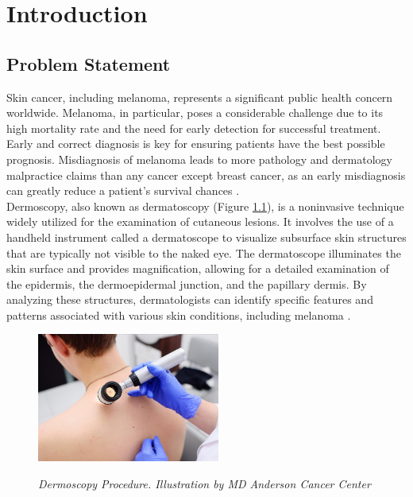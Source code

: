 \chapter{Introduction}
\label{cap:intro}

\section{Problem Statement}

Skin cancer, including melanoma, represents a significant public health concern
worldwide. Melanoma, in particular, poses a considerable challenge due to its
high mortality rate and the need for early detection for successful treatment.
Early and correct diagnosis is key for ensuring patients have the best possible
prognosis. Misdiagnosis of melanoma leads to more pathology and dermatology
malpractice claims than any cancer except breast cancer, as an early
misdiagnosis can greatly reduce a patient's survival chances \cite{Melanoma}. \\

Dermoscopy, also known as dermatoscopy (Figure \ref{fig:procedure_dermoscopy}),
is a noninvasive technique widely utilized for the examination of cutaneous
lesions. It involves the use of a handheld instrument called a dermatoscope to
visualize subsurface skin structures that are typically not visible to the
naked eye. The dermatoscope illuminates the skin surface and provides
magnification, allowing for a detailed examination of the epidermis, the
dermoepidermal junction, and the papillary dermis. By analyzing these
structures, dermatologists can identify specific features and patterns
associated with various skin conditions, including melanoma \cite{Dermoscopy}.

\begin{figure}[htb] \centering
  \includegraphics[width=6cm]{imatges/introduction/medical_procedure_dermastocopy.jpeg}
  \caption[Dermoscopy Procedure]{\textit{Dermoscopy Procedure. Illustration by MD Anderson Cancer Center}}
  {\label{fig:procedure_dermoscopy}}
\end{figure}

